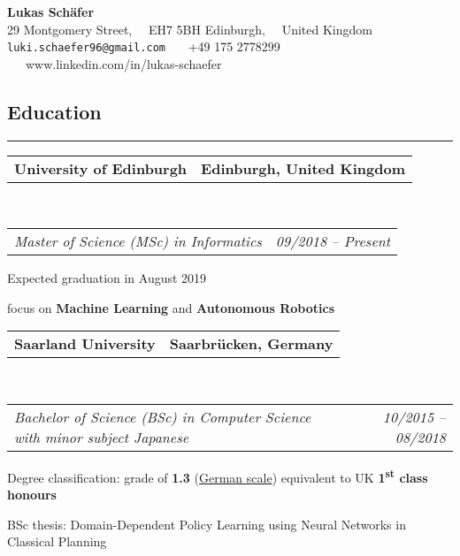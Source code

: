 \documentclass[10pt,letterpaper]{article}
\makeatletter
\newcommand{\headerrow}[2]
{\begin{tabular*}{\linewidth}{l@{\extracolsep{\fill}}r}
	#1 &
	#2 \\
\end{tabular*}}
\makeatother
\begin{document}
\begin{center}
{\LARGE \textbf{Lukas Schäfer}}
\\
29 Montgomery Street, \ \ EH7 5BH Edinburgh, \ \ United Kingdom
\\
\texttt{luki.schaefer96@gmail.com} \ \textbullet \ \ +49 175 2778299 \ \textbullet \ \ www.linkedin.com/in/lukas-schaefer
\end{center}

\subsection*{Education}
\hrule
\vspace{0.4em}

\noindent
\headerrow{\textbf{University of Edinburgh}}{\textbf{Edinburgh, United Kingdom}}
\\
\headerrow{\emph{Master of Science (MSc) in Informatics}}{\emph{09/2018 -- Present}}
\vspace{-1.6em}
\begin{itemize*}
    \item Expected graduation in August 2019
    \item focus on \textbf{Machine Learning} and \textbf{Autonomous Robotics}
\end{itemize*}


\noindent
\headerrow{\textbf{Saarland University}}{\textbf{Saarbrücken, Germany}}
\\
\headerrow{\emph{Bachelor of Science (BSc) in Computer Science with minor subject Japanese}}{\emph{10/2015 -- 08/2018}}
\vspace{-1.6em}
\begin{itemize*}
    \item Degree classification: grade of \textbf{1.3} (\href{https://en.wikipedia.org/wiki/Academic_grading_in_Germany}{German scale}) equivalent to UK \textbf{1\textsuperscript{st} class honours}
    \item BSc thesis: Domain-Dependent Policy Learning using Neural Networks in Classical Planning
\end{itemize*}

\end{document}

